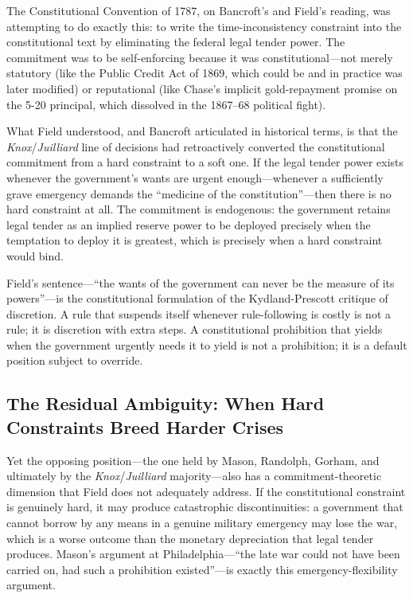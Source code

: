 \documentclass[12pt]{article}
\begin{document}
The Constitutional Convention of 1787, on Bancroft's and Field's
reading, was attempting to do exactly this: to write the time-inconsistency
constraint into the constitutional text by eliminating the federal
legal tender power. The commitment was to be self-enforcing because
it was constitutional---not merely statutory (like the Public Credit
Act of 1869, which could be and in practice was later modified) or
reputational (like Chase's implicit gold-repayment promise on the
5-20 principal, which dissolved in the 1867--68 political fight).

What Field understood, and Bancroft articulated in historical terms,
is that the \textit{Knox}/\textit{Juilliard} line of decisions had
retroactively converted the constitutional commitment from a hard
constraint to a soft one. If the legal tender power exists whenever
the government's wants are urgent enough---whenever a sufficiently
grave emergency demands the ``medicine of the constitution''---then
there is no hard constraint at all. The commitment is endogenous:
the government retains legal tender as an implied reserve power to
be deployed precisely when the temptation to deploy it is greatest,
which is precisely when a hard constraint would bind.

Field's sentence---``the wants of the government can never be the
measure of its powers''---is the constitutional formulation of the
Kydland-Prescott critique of discretion. A rule that suspends itself
whenever rule-following is costly is not a rule; it is discretion
with extra steps. A constitutional prohibition that yields when the
government urgently needs it to yield is not a prohibition; it is a
default position subject to override.

\subsection{The Residual Ambiguity: When Hard Constraints Breed
Harder Crises}

Yet the opposing position---the one held by Mason, Randolph, Gorham,
and ultimately by the \textit{Knox}/\textit{Juilliard} majority---also
has a commitment-theoretic dimension that Field does not adequately
address. If the constitutional constraint is genuinely hard, it may
produce catastrophic discontinuities: a government that cannot borrow
by any means in a genuine military emergency may lose the war, which
is a worse outcome than the monetary depreciation that legal tender
produces. Mason's argument at Philadelphia---``the late war could not
have been carried on, had such a prohibition existed''---is exactly
this emergency-flexibility argument.
\end{document}
